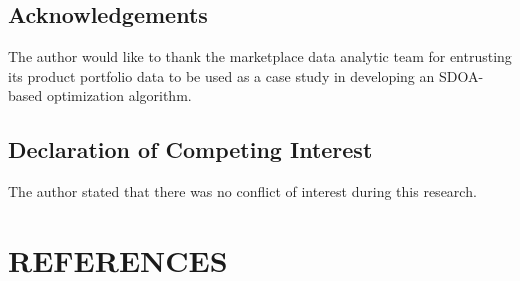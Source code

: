 \documentclass[
]{article}
\begin{document}
\hypertarget{acknowledgements}{%
\subsection{Acknowledgements}\label{acknowledgements}}

The author would like to thank the marketplace data analytic team for
entrusting its product portfolio data to be used as a case study in
developing an SDOA-based optimization algorithm.

\hypertarget{declaration-of-competing-interest}{%
\subsection{Declaration of Competing
Interest}\label{declaration-of-competing-interest}}

The author stated that there was no conflict of interest during this
research.

\hypertarget{references}{%
\section*{REFERENCES}\label{references}}
\end{document}
